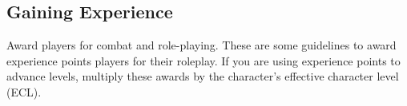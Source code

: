 
\subsection{Gaining Experience}
Award players for combat and role-playing. These are some guidelines to award experience points players for their roleplay. If you are using experience points to advance levels, multiply these awards by the character's effective character level (ECL).

